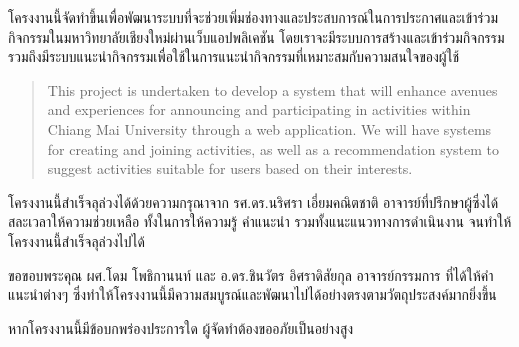 \maketitle
\makesignature

\ifproject
\begin{abstractTH}
    \hspace{4ex} 
    โครงงานนี้จัดทำขึ้นเพื่อพัฒนาระบบที่จะช่วยเพิ่มช่องทางและประสบการณ์ในการประกาศและเข้าร่วมกิจกรรมในมหาวิทยาลัยเชียงใหม่ผ่านเว็บแอปพลิเคชัน
    โดยเราจะมีระบบการสร้างและเข้าร่วมกิจกรรม รวมถึงมีระบบแนะนํากิจกรรมเพื่อใช้ในการแนะนํากิจกรรมที่เหมาะสมกับความสนใจของผู้ใช้
\end{abstractTH}

\begin{abstract}
    \hspace{4ex} 
    This project is undertaken to develop a system that will enhance avenues and experiences for announcing and participating in activities within Chiang Mai University through a web application. We will have systems for creating and joining activities, as well as a recommendation system to suggest activities suitable for users based on their interests.

\end{abstract}

\iffalse
\begin{dedication}
This document is dedicated to all Chiang Mai University students.

Dedication page is optional.
\end{dedication}
\fi %

\begin{acknowledgments}
    \hspace{4ex} โครงงานนี้สำเร็จลุล่วงได้ด้วยความกรุณาจาก รศ.ดร.นริศรา เอี่ยมคณิตชาติ อาจารย์ที่ปรึกษาผู้ซึ่งได้สละเวลาให้ความช่วยเหลือ ทั้งในการให้ความรู้ คำแนะนำ รวมทั้งแนะแนวทางการดำเนินงาน จนทำให้โครงงานนี้สำเร็จลุล่วงไปได้

    \enskip ขอขอบพระคุณ ผศ.โดม โพธิกานนท์ และ อ.ดร.ชินวัตร อิศราดิสัยกุล อาจารย์กรรมการ ที่ได้ให้คำแนะนำต่างๆ ซึ่งทำให้โครงงานนี้มีความสมบูรณ์และพัฒนาไปได้อย่างตรงตามวัตถุประสงค์มากยิ่งขึ้น

    \enskip หากโครงงานนี้มีข้อบกพร่องประการใด ผู้จัดทำต้องขออภัยเป็นอย่างสูง

\end{acknowledgments}%
\fi %

\contentspage

\ifproject
\figurelistpage

\tablelistpage
\fi %




